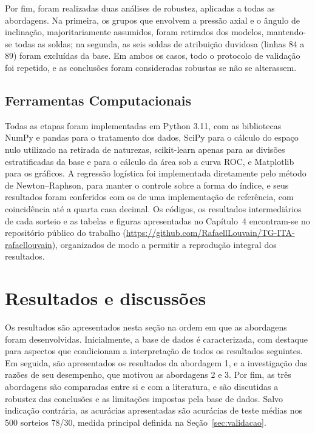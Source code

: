 \documentclass[12pt,openany]{report}
\begin{document}
Por fim, foram realizadas duas análises de robustez, aplicadas a todas as abordagens. Na primeira, os grupos que envolvem a pressão axial e o ângulo de inclinação, majoritariamente assumidos, foram retirados dos modelos, mantendo-se todas as soldas; na segunda, as seis soldas de atribuição duvidosa (linhas 84 a 89) foram excluídas da base. Em ambos os casos, todo o protocolo de validação foi repetido, e as conclusões foram consideradas robustas se não se alterassem.

\section{Ferramentas Computacionais}
\label{sec:ferramentas}

Todas as etapas foram implementadas em Python 3.11, com as bibliotecas NumPy e pandas para o tratamento dos dados, SciPy para o cálculo do espaço nulo utilizado na retirada de naturezas, scikit-learn apenas para as divisões estratificadas da base e para o cálculo da área sob a curva ROC, e Matplotlib para os gráficos. A regressão logística foi implementada diretamente pelo método de Newton--Raphson, para manter o controle sobre a forma do índice, e seus resultados foram conferidos com os de uma implementação de referência, com coincidência até a quarta casa decimal. Os códigos, os resultados intermediários de cada sorteio e as tabelas e figuras apresentadas no Capítulo~4 encontram-se no repositório público do trabalho (\url{https://github.com/RafaellLouvain/TG-ITA-rafaellouvain}), organizados de modo a permitir a reprodução integral dos resultados.


\chapter{Resultados e discussões}
\label{cap:resultados}

Os resultados são apresentados nesta seção na ordem em que as abordagens foram desenvolvidas. Inicialmente, a base de dados é caracterizada, com destaque para aspectos que condicionam a interpretação de todos os resultados seguintes. Em seguida, são apresentados os resultados da abordagem 1, e a investigação das razões de seu desempenho, que motivou as abordagens 2 e 3. Por fim, as três abordagens são comparadas entre si e com a literatura, e são discutidas a robustez das conclusões e as limitações impostas pela base de dados. Salvo indicação contrária, as acurácias apresentadas são acurácias de teste médias nos 500 sorteios 78/30, medida principal definida na Seção~\ref{sec:validacao}.
\end{document}
